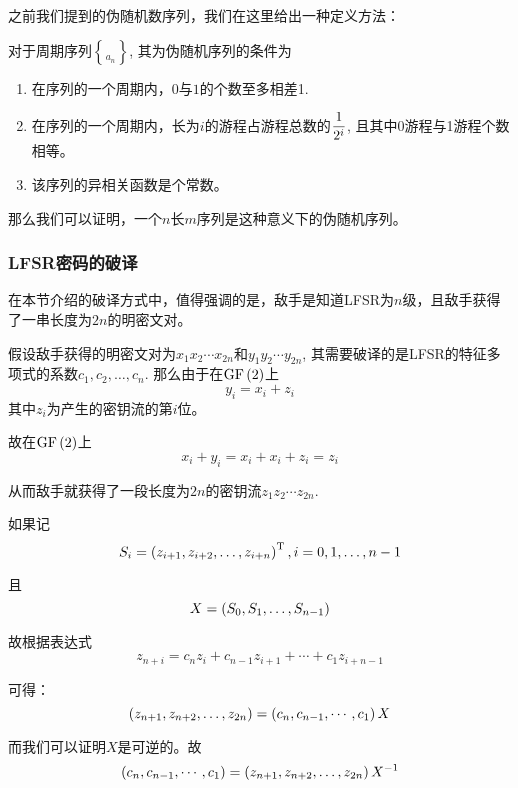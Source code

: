 之前我们提到的伪随机数序列，我们在这里给出一种定义方法：
\begin{Definition}
对于周期序列$\brace{a_n}$, 其为伪随机序列的条件为
\begin{enumerate}
    \item 在序列的一个周期内，$0$与$1$的个数至多相差1.
    \item 在序列的一个周期内，长为$i$的游程占游程总数的$\displaystyle\frac{1}{2^i}$, 且其中0游程与1游程个数相等。
    \item 该序列的异相关函数是个常数。
\end{enumerate}
\end{Definition}

那么我们可以证明，一个$n$长$m$序列是这种意义下的伪随机序列。
\subsubsection{LFSR密码的破译}
在本节介绍的破译方式中，值得强调的是，敌手是知道LFSR为$n$级，且敌手获得了一串长度为$2n$的明密文对。\par
假设敌手获得的明密文对为$x_1x_2\cdots x_{2n}$和$y_1y_2\cdots y_{2n}$, 其需要破译的是LFSR的特征多项式的系数$c_1, c_2,\ldots, c_n$. 那么由于在$\mathrm{GF}\left( {2}\right)$上
\[y_i=x_i+z_i\]
其中$z_i$为产生的密钥流的第$i$位。\par
故在$\mathrm{GF}\left( {2}\right)$上
\[x_i+y_i=x_i+x_i+z_i=z_i\]

从而敌手就获得了一段长度为$2n$的密钥流$z_1z_2\cdots z_{2n}$.\par
如果记
\begin{equation}
    S_i=\left( {z_{i+1}, z_{i+2}, \ldots, z_{i+n}}\right)^{\mathrm{T}}, i=0, 1,\ldots, n-1
\end{equation}

且
\begin{equation}
    X=\left( {S_0,S_1,\ldots, S_{n-1}}\right)
\end{equation}

故根据表达式
\begin{equation}
    z_{n+i}=c_nz_{i}+c_{n-1}z_{i+1}+\cdots +c_{1}z_{i+n-1}
\end{equation}

可得：
\begin{equation}
    \left( {z_{n+1}, z_{n+2},\ldots, z_{2n}}\right)=\left( {c_n, c_{n-1}, \cdots ,c_{1}}\right)X
\end{equation}

而我们可以证明$X$是可逆的。故
\begin{equation}
    \left( {c_n, c_{n-1}, \cdots ,c_{1}}\right)=\left( {z_{n+1}, z_{n+2},\ldots, z_{2n}}\right)X^{-1}
\end{equation}
